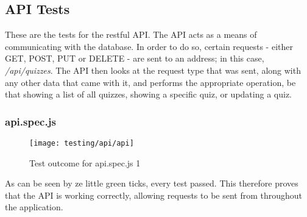 \subsection{API Tests}
These are the tests for the restful API. The API acts as a means of communicating with the database. In order to do so, certain requests - either GET, POST, PUT or DELETE - are sent to an address; in this case, \textit{/api/quizzes}. The API then looks at the request type that was sent, along with any other data that came with it, and performs the appropriate operation, be that showing a list of all quizzes, showing a specific quiz, or updating a quiz.

\subsubsection{api.spec.js} %
\label{ssub:api_spec_js}

\begin{figure}[h!]
  \texttt{[image: testing/api/api]}
  \caption{Test outcome for api.spec.js 1}
\end{figure}

As can be seen by ze little green ticks, every test passed. This therefore proves that the API is working correctly, allowing requests to be sent from throughout the application.

